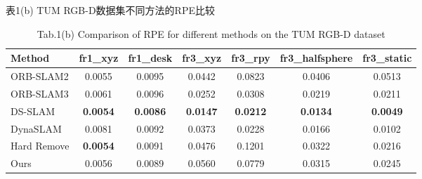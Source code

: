\begin{table}[htbp]
\centering
\caption{表1(b) TUM RGB-D数据集不同方法的RPE比较}
\caption*{Tab.1(b) Comparison of RPE for different methods on the TUM RGB-D dataset}
\label{tab:tum_rpe}
\begin{tabular}{lcccccc}
\toprule
Method & fr1\_xyz & fr1\_desk & fr3\_xyz & fr3\_rpy & fr3\_halfsphere & fr3\_static \\
\midrule
ORB-SLAM2 & 0.0055 & 0.0095 & 0.0442 & 0.0823 & 0.0406 & 0.0513 \\
ORB-SLAM3 & 0.0061 & 0.0096 & 0.0252 & 0.0308 & 0.0219 & 0.0211 \\
DS-SLAM & \textbf{0.0054} & \textbf{0.0086} & \textbf{0.0147} & \textbf{0.0212} & \textbf{0.0134} & \textbf{0.0049} \\
DynaSLAM & 0.0081 & 0.0092 & 0.0373 & 0.0228 & 0.0166 & 0.0102 \\
Hard Remove & \textbf{0.0054} & 0.0091 & 0.0476 & 0.1201 & 0.0322 & 0.0216 \\
Ours & 0.0056 & 0.0089 & 0.0560 & 0.0779 & 0.0315 & 0.0245 \\
\bottomrule
\end{tabular}
\end{table}
